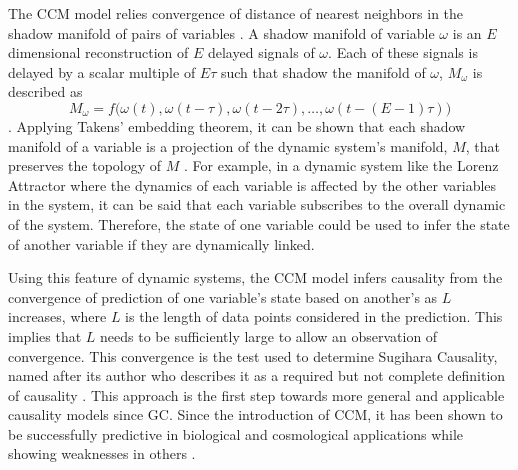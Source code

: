 The CCM model relies convergence of distance of nearest neighbors in the shadow manifold of pairs of variables \cite{Sugihara2012}. A shadow manifold of variable $\omega$ is an $E$ dimensional reconstruction of $E$ delayed signals of $\omega$. Each of these signals is delayed by a scalar multiple of $E\tau$ such that shadow the manifold of $\omega$, $M_{\omega}$ is described as 
$$M_{\omega} = f\Big(\omega(t), \omega(t-\tau), \omega(t-2\tau), \dots, \omega(t-(E-1)\tau)\Big)$$.
Applying Takens' embedding theorem, it can be shown that each shadow manifold of a variable is a projection of the dynamic system's manifold, $M$, that preserves the topology of $M$ \cite{Dixon1999,Deyle2011,Takens1981}. For example, in a dynamic system like the Lorenz Attractor where the dynamics of each variable is affected by the other variables in the system, it can be said that each variable subscribes to the overall dynamic of the system. Therefore, the state of one variable could be used to infer the state of another variable if they are dynamically linked. 

Using this feature of dynamic systems, the CCM model infers causality from the convergence of prediction of one variable's state based on another's as $L$ increases, where $L$ is the length of data points considered in the prediction. This implies that $L$ needs to be sufficiently large to allow an observation of convergence. This convergence is the test used to determine Sugihara Causality, named after its author who describes it as a required but not complete definition of causality \cite{Sugihara2012}. This approach is the first step towards more general and applicable causality models since GC. Since the introduction of CCM, it has been shown to be successfully predictive in biological \cite{Deyle16042013,Wang2014,Sugihara2012,Mcbride2015,Nes2015} and cosmological \cite{Tsonis2015} applications while showing weaknesses in others \cite{Mccracken2014}. 

